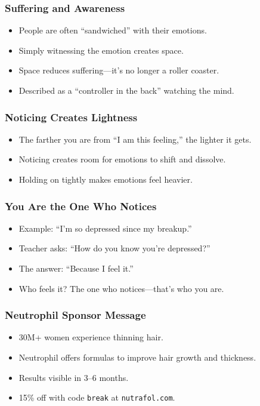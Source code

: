 \begin{frame}[fragile]\frametitle{Suffering and Awareness}
  \begin{itemize}
    \item People are often “sandwiched” with their emotions.
    \item Simply witnessing the emotion creates space.
    \item Space reduces suffering—it’s no longer a roller coaster.
    \item Described as a “controller in the back” watching the mind.
  \end{itemize}
\end{frame}

\begin{frame}[fragile]\frametitle{Noticing Creates Lightness}
  \begin{itemize}
    \item The farther you are from “I am this feeling,” the lighter it gets.
    \item Noticing creates room for emotions to shift and dissolve.
    \item Holding on tightly makes emotions feel heavier.
  \end{itemize}
\end{frame}

\begin{frame}[fragile]\frametitle{You Are the One Who Notices}
  \begin{itemize}
    \item Example: “I’m so depressed since my breakup.”
    \item Teacher asks: “How do you know you’re depressed?”
    \item The answer: “Because I feel it.”
    \item Who feels it? The one who notices—that’s who you are.
  \end{itemize}
\end{frame}

\begin{frame}[fragile]\frametitle{Neutrophil Sponsor Message}
  \begin{itemize}
    \item 30M+ women experience thinning hair.
    \item Neutrophil offers formulas to improve hair growth and thickness.
    \item Results visible in 3–6 months.
    \item 15\% off with code \texttt{break} at \texttt{nutrafol.com}.
  \end{itemize}
\end{frame}

